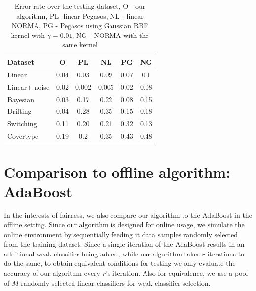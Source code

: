 \begin{table}
\centering
\begin{tabular}{| p{1.5cm}|  c |  c | c | c | c |}
\hline
 Dataset & O & PL & NL & PG & NG \\ \hline
Linear& 0.04 & 0.03 & 0.09 &0.07 &0.1 \\ \hline
Linear+ noise & 0.02 & 0.002 & 0.005 & 0.02 & 0.08 \\ \hline
Bayesian & 0.03 &0.17 & 0.22 & 0.08 & 0.15 \\ \hline
Drifting & 0.04 & 0.28 & 0.35 & 0.15&0.18 \\ \hline
Switching & 0.11 & 0.20 &0.21 & 0.32 & 0.13  \\ \hline
Covertype & 0.19 & 0.2 & 0.35 & 0.43 & 0.48 \\
\hline
\end{tabular}

\caption[Comparison to NORMA and Pegasos: Error rate over testing dataset]{Error rate over the testing dataset, O - our algorithm, PL -linear Pegasos, NL - linear NORMA, PG - Pegasos using Gaussian RBF kernel with $\gamma=0.01$, NG - NORMA with the same kernel}
\label{GenError}
\end{table}

\section{Comparison to offline algorithm: AdaBoost}
\label{AdaCompare}
In the interests of fairness, we also compare our algorithm to the AdaBoost in the offline setting. Since our algorithm is designed for online usage, we simulate the online environment by sequentially feeding it data samples randomly selected from the training dataset. Since a single iteration of the AdaBoost results in an additional weak classifier being added, while our algorithm takes $r$ iterations to do the same, to obtain equivalent conditions for testing we only evaluate the accuracy of our algorithm every $r$'s iteration. Also for equivalence, we use a pool of $M$ randomly selected linear classifiers for weak classifier selection.

